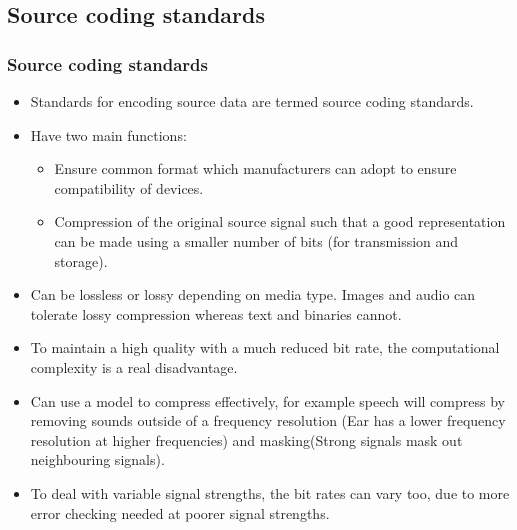 \documentclass{beamer}
\begin{document}
\subsection{Source coding standards}
\begin{frame}
\frametitle{Source coding standards}
\begin{itemize}
\small
\item Standards for encoding source data are termed {\color{green} source coding standards}.
\item Have two main functions:
\begin{itemize}
\item Ensure common format which manufacturers can adopt to ensure compatibility of devices.
\item Compression of the original source signal such that a good representation can be made using a smaller number of bits (for transmission and storage).
\end{itemize}
\item Can be {\color{red} lossless} or {\color{purple} lossy} depending on media type. Images and audio can tolerate {\color{purple} lossy} compression whereas text and binaries cannot.
\item To maintain a high quality with a much reduced bit rate, the computational complexity is a real disadvantage.
\item Can use a model to compress effectively, for example speech will compress by removing sounds outside of a {\color{magenta} frequency resolution} (Ear has a lower frequency resolution at higher frequencies) and {\color{blue}masking}(Strong signals mask out neighbouring signals).
\item To deal with variable signal strengths, the bit rates can vary too, due to more error checking needed at poorer signal strengths.
\end{itemize}
\end{frame}
\end{document}
